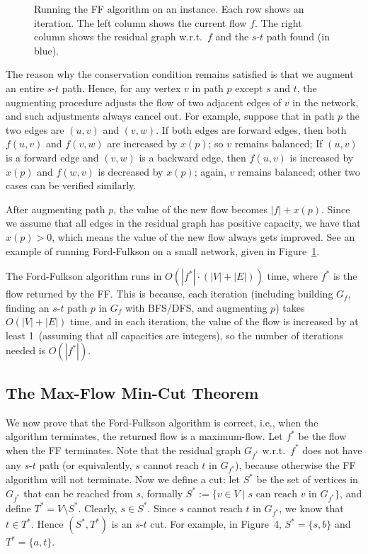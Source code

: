 \begin{figure}[!b]
\centering{}
\caption{Running the FF algorithm on an instance. Each row shows an iteration. The left column shows
the current flow $f$. The right column shows the residual graph w.r.t.\ $f$ and the $s$-$t$ path found (in blue).}
\label{fig:ff}
\end{figure}


The reason why the conservation condition remains satisfied is that we augment an entire $s$-$t$ path. Hence,
for any vertex $v$ in path $p$ except $s$ and $t$, the augmenting procedure adjusts the
flow of two adjacent edges of $v$ in the network, and such adjustments always
cancel out. For example, suppose that in path $p$ the two edges are $(u,v)$ and
$(v,w)$. If both edges are forward edges, then both $f(u,v)$ and $f(v,w)$ are
increased by $x(p)$; so $v$ remains balanced; If $(u, v)$ is a forward edge and $(v,
		w)$ is a backward edge, then $f (u, v)$ is increased by $x(p)$ and $f(w,v)$ is
decreased by $x(p)$; again, $v$ remains balanced; other two cases can be verified
similarly.

After augmenting path $p$, the value of the new flow becomes $|f|+x(p)$. Since we
assume that all edges in the residual graph has positive capacity, we have that
$x(p) > 0$, which means the value of the new flow always gets improved. 
See an example of running Ford-Fulkson on a small network, given in Figure~\ref{fig:ff}.


The Ford-Fulkson algorithm runs in $O(|f^*|\cdot(|V|+|E|))$ time,
where $f^*$ is the flow returned by the FF. 
This is because, each iteration (including building $G_f$, finding an $s$-$t$ path $p$ in $G_f$
with BFS/DFS, and augmenting $p$) takes $O(|V|+|E|)$ time, and in each iteration,
the value of the flow is increased by at least 1~(assuming that all capacities are integers),
so the number of iterations needed is $O(|f^*|)$.




\subsection*{The Max-Flow Min-Cut Theorem}

We now prove that the Ford-Fulkson algorithm is correct, i.e., when the algorithm terminates,
the returned flow is a maximum-flow.  
Let $f^*$ be the flow when the FF terminates. Note that the residual graph $G_{f^*}$ w.r.t.\ $f^*$ does
not have any $s$-$t$ path (or equivalently, $s$ cannot reach $t$ in $G_{f^*}$), because otherwise the FF algorithm will
not terminate. Now we define a cut: let $S^*$ be the set of vertices in  $G_{f^*}$ that can be reached from $s$, formally 
$S^* := \{v\in V\mid s \textrm{ can reach $v$ in } G_{f^*} \}$,
and define $T^* = V\setminus S^*$.
Clearly, $s\in S^*$.  Since $s$ cannot reach $t$ in $G_{f^*}$, we know that $t\in T^*$. Hence
$(S^*, T^*)$ is an $s$-$t$ cut. For example, in Figure~4, $S^* = \{s,b\}$ and $T^* = \{a,t\}$.

